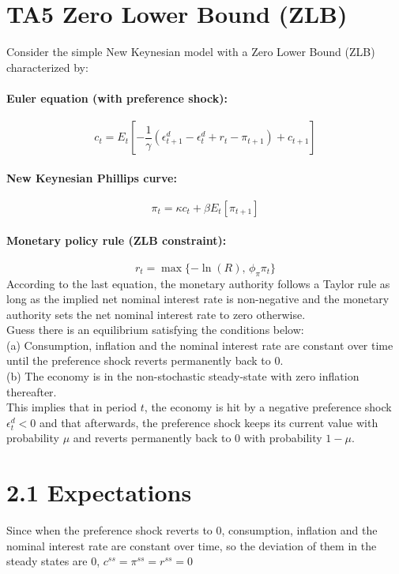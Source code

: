 \documentclass[12pt]{article}
\begin{document}
\section*{TA5 Zero Lower Bound (ZLB)}

Consider the simple New Keynesian model with a Zero Lower Bound (ZLB) characterized by:

\paragraph{Euler equation (with preference shock):}
\[
c_t = E_t\left[-\frac{1}{\gamma}(\epsilon_{t+1}^d - \epsilon_t^d + r_t - \pi_{t+1}) + c_{t+1}\right]
\]

\paragraph{New Keynesian Phillips curve:}
\[
\pi_t = \kappa c_t + \beta E_t[\pi_{t+1}]
\]

\paragraph{Monetary policy rule (ZLB constraint):}
\[
r_t = \max\{-\ln(R),\, \phi_{\pi}\pi_t\}
\]
According to the last equation, the monetary authority follows a Taylor rule as long as the
implied net nominal interest rate is non-negative and the monetary authority sets the net
nominal interest rate to zero otherwise.\\
Guess there is an equilibrium satisfying the conditions below:\\
(a) Consumption, inflation and the nominal interest rate are constant over time until the
preference shock reverts permanently back to 0.\\
(b) The economy is in the non-stochastic steady-state with zero inflation thereafter.\\
This implies that in period $t$, the economy is hit by a negative preference shock $\epsilon_t^d
< 0$ and that afterwards, the preference shock keeps its current value with probability $\mu$ and reverts permanently back to $0$ with probability $1-\mu$.

\section*{2.1 Expectations}
Since when the preference shock reverts to 0, consumption, inflation and the nominal interest rate are constant over time, so the deviation of them in the steady states are $0$, $c^{ss}=\pi^{ss}=r^{ss}=0$
\end{document}
